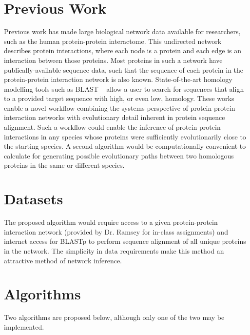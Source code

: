 \documentclass{acmsiggraph}               %
\begin{document}

\section{Previous Work}
\label{sec:previous_work}
Previous work has made large biological network data available for researchers, such as the human protein-protein interactome. This undirected network describes protein interactions, where each node is a protein and each edge is an interaction between those proteins. Most proteins in such a network have publically-available sequence data, such that the sequence of each protein in the protein-protein interaction network is also known. State-of-the-art homology modelling tools such as BLAST ~\cite{altschul_basic_1990} allow a user to search for sequences that align to a provided target sequence with high, or even low, homology. These works enable a novel workflow combining the systems perspective of protein-protein interaction networks with evolutionary detail inherent in protein sequence alignment. Such a workflow could enable the inference of protein-protein interactions in any species whose proteins were sufficiently evolutionarily close to the starting species. A second algorithm would be computationally convenient to calculate for generating possible evolutionary paths between two homologous proteins in the same or different species. 

\section{Datasets}
\label{sec:analysis}
The proposed algorithm would require access to a given protein-protein interaction network (provided by Dr. Ramsey for in-class assignments) and internet access for BLASTp to perform sequence alignment of all unique proteins in the network. The simplicity in data requirements make this method an attractive method of network inference.

\section{Algorithms}
\label{sec:algorithms}

Two algorithms are proposed below, although only one of the two may be implemented.
\end{document}
